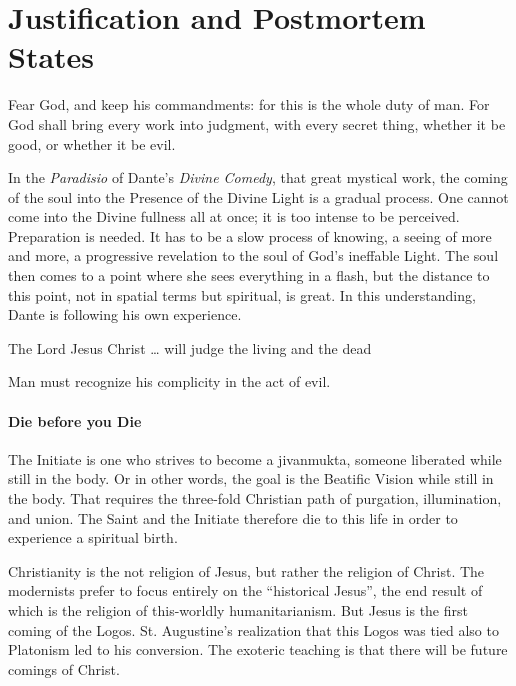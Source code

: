 \section{Justification and Postmortem States}

\begin{quotex}
Fear God, and keep his commandments: for this is the whole duty of man. For God shall bring every work into judgment,
with every secret thing, whether it be good, or whether it be evil. 

In the \emph{Paradisio} of Dante's \emph{Divine Comedy}, that great mystical work, the coming of the soul
into the Presence of the Divine Light is a gradual process. One cannot come into the Divine fullness all at once; it is
too intense to be perceived. Preparation is needed. It has to be a slow process of knowing, a seeing of more and more,
a progressive revelation to the soul of God's ineffable Light. The soul then comes to a point where she
sees everything in a flash, but the distance to this point, not in spatial terms but spiritual, is great. In this
understanding, Dante is following his own experience. 

The Lord Jesus Christ … will judge the living and the dead 

Man must recognize his complicity in the act of evil.  

\end{quotex}

\paragraph{Die before you Die}
The Initiate is one who strives to become a jivanmukta, someone liberated while still in the body. Or in other words,
the goal is the Beatific Vision while still in the body. That requires the three-fold Christian path of purgation,
illumination, and union. The Saint and the Initiate therefore die to this life in order to experience a spiritual
birth.

Christianity is the not religion of Jesus, but rather the religion of Christ. The modernists prefer to focus entirely on
the “historical Jesus”, the end result of which is the religion of this-worldly humanitarianism. But Jesus is the first
coming of the Logos. St. Augustine's realization that this Logos was tied also to Platonism led to his
conversion. The exoteric teaching is that there will be future comings of Christ.

